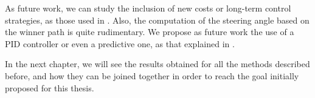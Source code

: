 As future work, we can study the inclusion of new costs or long-term control strategies, as those used in \cite{werling2010optimal}. Also, the computation of the steering angle based on the winner path is quite rudimentary. We propose as future work the use of a \ac{PID} controller or even a predictive one, as that explained in .

In the next chapter, we will see the results obtained for all the methods described before, and how they can be joined together in order to reach the goal initially proposed for this thesis.


